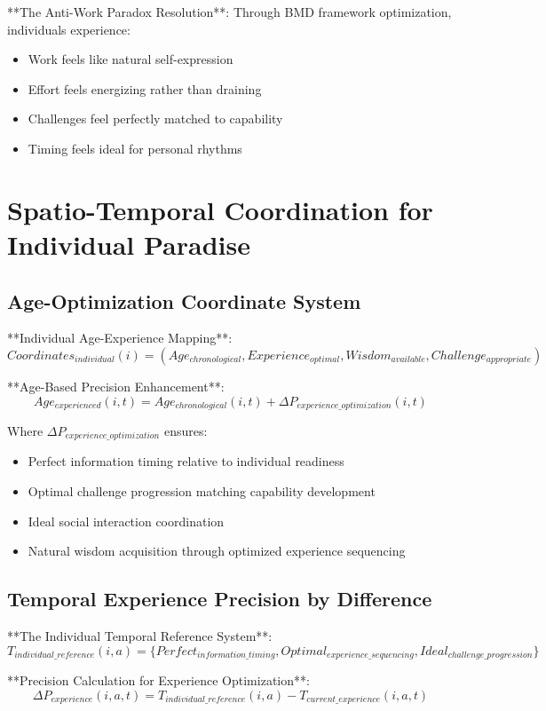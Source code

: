 \documentclass[12pt,a4paper]{article}
\begin{document}
**The Anti-Work Paradox Resolution**:
Through BMD framework optimization, individuals experience:
\begin{itemize}
\item Work feels like natural self-expression
\item Effort feels energizing rather than draining
\item Challenges feel perfectly matched to capability
\item Timing feels ideal for personal rhythms
\end{itemize}

\section{Spatio-Temporal Coordination for Individual Paradise}

\subsection{Age-Optimization Coordinate System}

**Individual Age-Experience Mapping**:
$$Coordinates_{individual}(i) = (Age_{chronological}, Experience_{optimal}, Wisdom_{available}, Challenge_{appropriate})$$

**Age-Based Precision Enhancement**:
$$Age_{experienced}(i,t) = Age_{chronological}(i,t) + \Delta P_{experience\_optimization}(i,t)$$

Where $\Delta P_{experience\_optimization}$ ensures:
\begin{itemize}
\item Perfect information timing relative to individual readiness
\item Optimal challenge progression matching capability development
\item Ideal social interaction coordination
\item Natural wisdom acquisition through optimized experience sequencing
\end{itemize}

\subsection{Temporal Experience Precision by Difference}

**The Individual Temporal Reference System**:
$$T_{individual\_reference}(i,a) = \{Perfect_{information\_timing}, Optimal_{experience\_sequencing}, Ideal_{challenge\_progression}\}$$

**Precision Calculation for Experience Optimization**:
$$\Delta P_{experience}(i,a,t) = T_{individual\_reference}(i,a) - T_{current\_experience}(i,a,t)$$
\end{document}
